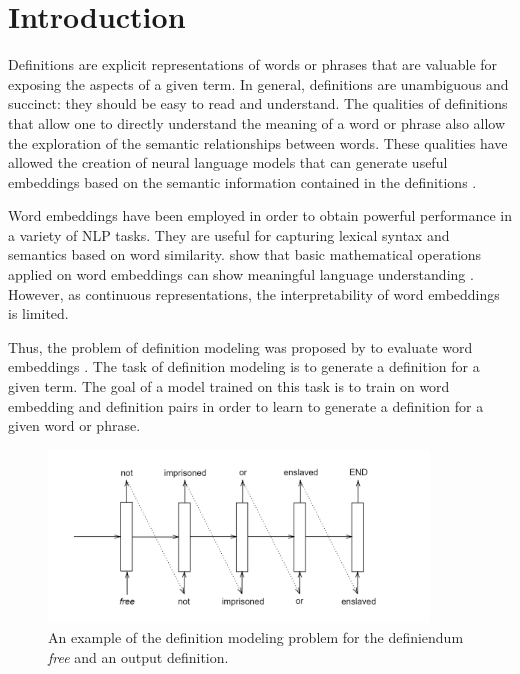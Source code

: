 \section{Introduction}
Definitions are explicit representations of words or phrases that are valuable
for exposing the aspects of a given term. In general, definitions are
unambiguous and succinct: they should be easy to read and understand. The
qualities of definitions that allow one to directly understand the meaning of a
word or phrase also allow the exploration of the semantic relationships between
words. These qualities have allowed the creation of neural language models that
can generate useful embeddings based on the semantic information contained in
the definitions \cite{hill_learning_2016, bosc_auto_2018}.

Word embeddings have been employed in order to obtain powerful
performance in a variety of NLP tasks. They are useful for capturing lexical
syntax and semantics based on word similarity. \cite{mikolov_distributed_2013}
show that basic mathematical operations applied on word embeddings can show
meaningful language understanding \cite{mikolov_distributed_2013}. However, as
continuous representations, the interpretability of word embeddings is limited.

Thus, the problem of definition modeling was proposed by
\cite{noraset_definition_2016} to evaluate word embeddings
\cite{noraset_definition_2016}. The task of definition modeling is to generate a
definition for a given term. The goal of a model trained on this task is to
train on word embedding and definition pairs in order to learn to generate a
definition for a given word or phrase.

\begin{figure}
    \centering
    \includegraphics[width=0.9\textwidth]{assets/defmodel.png}
    \caption{An example of the definition modeling problem for the definiendum
        \textit{free} and an output definition.}
\end{figure}

